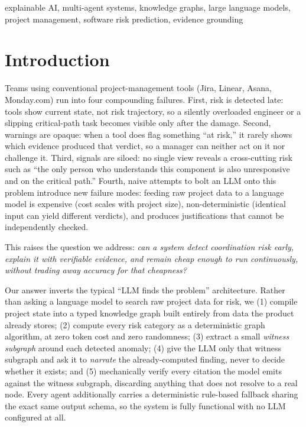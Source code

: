 \documentclass[conference]{IEEEtran}
\begin{document}
\begin{IEEEkeywords}
explainable AI, multi-agent systems, knowledge graphs, large language models, project
management, software risk prediction, evidence grounding
\end{IEEEkeywords}

\section{Introduction}

Teams using conventional project-management tools (Jira, Linear, Asana, Monday.com)
run into four compounding failures. First, risk is detected late: tools show current
state, not risk trajectory, so a silently overloaded engineer or a slipping
critical-path task becomes visible only after the damage. Second, warnings are opaque:
when a tool does flag something ``at risk,'' it rarely shows which evidence produced
that verdict, so a manager can neither act on it nor challenge it. Third, signals are
siloed: no single view reveals a cross-cutting risk such as ``the only person who
understands this component is also unresponsive and on the critical path.'' Fourth,
naive attempts to bolt an LLM onto this problem introduce new failure modes: feeding
raw project data to a language model is expensive (cost scales with project size),
non-deterministic (identical input can yield different verdicts), and produces
justifications that cannot be independently checked.

This raises the question we address: \emph{can a system detect coordination risk
early, explain it with verifiable evidence, and remain cheap enough to run
continuously, without trading away accuracy for that cheapness?}

Our answer inverts the typical ``LLM finds the problem'' architecture. Rather than
asking a language model to search raw project data for risk, we (1) compile project
state into a typed knowledge graph built entirely from data the product already
stores; (2) compute every risk category as a deterministic graph algorithm, at zero
token cost and zero randomness; (3) extract a small \emph{witness subgraph} around
each detected anomaly; (4) give the LLM only that witness subgraph and ask it to
\emph{narrate} the already-computed finding, never to decide whether it exists; and
(5) mechanically verify every citation the model emits against the witness subgraph,
discarding anything that does not resolve to a real node. Every agent additionally
carries a deterministic rule-based fallback sharing the exact same output schema, so
the system is fully functional with no LLM configured at all.
\end{document}
